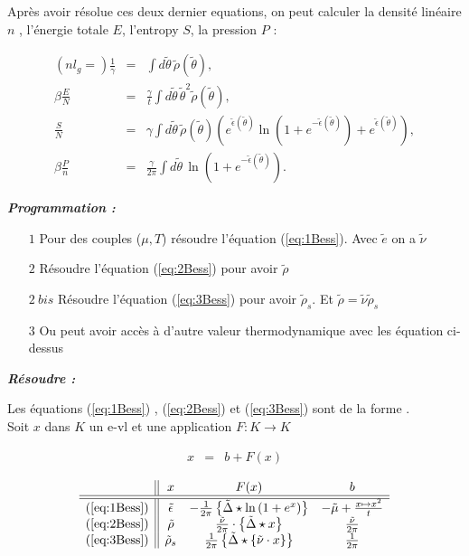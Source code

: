 Après avoir résolue ces deux dernier equations, on peut calculer la densité linéaire $n$ , l'énergie totale $E$, l'entropy $S$, la pression $P$ : 

\begin{eqnarray}\label{eq:5Bess}
	(nl_g = ) \frac{1}{\gamma} & = & \int d \tilde{\theta} \,\tilde{\rho}(\tilde{\theta}), \\
	\beta \frac{E}{N} & = & \frac{\gamma}{t} \int d \tilde{\theta}\,  \tilde{\theta}^2 \tilde{\rho}(\tilde{\theta}), \\
	\frac{S}{N} & = & \gamma 	\int d \tilde{\theta} \,\tilde{\rho}(\tilde{\theta}) \left ( e^{\tilde{\epsilon}(\tilde{\theta})} \ln \left ( 1 + e^{-\tilde{\epsilon}(\tilde{\theta})}  \right ) + e^{\tilde{\epsilon}(\tilde{\theta})} \right )  ,\\
	\beta \frac{P}{n}  & = & \frac{\gamma}{2 \pi} \int d \tilde{\theta} \, \ln \left ( 1 + e^{-\tilde{\epsilon}(\tilde{\theta})}  \right ).
\end{eqnarray}


{ \bf \em Programmation :}

\begin{itemize}
	\item[$1$] Pour des couples ($\mu , T $) résoudre l'équation (\ref{eq:1Bess}). Avec $\tilde{e}$ on a $\tilde{\nu}$
	\item[$2$] Résoudre l'équation (\ref{eq:2Bess}) pour avoir $\tilde{\rho}$
	\item[$2 ~bis$] Résoudre l'équation (\ref{eq:3Bess}) pour avoir $\tilde{\rho}_s$. Et $\tilde{\rho} = \tilde{\nu} \tilde{\rho}_s$
	\item[$3$] Ou peut avoir accès à d'autre valeur thermodynamique avec les équation ci-dessus
\end{itemize}

{ \bf \em Résoudre :}



Les équations (\ref{eq:1Bess}) ,   (\ref{eq:2Bess}) et  (\ref{eq:3Bess}) sont de la forme .\\

Soit $x$ dans $K$ un e-vl  et une application $F \colon K \rightarrow K $

\begin{eqnarray}
	x & = & b + F ( x ) 	
\end{eqnarray}


$$
\begin{array}{c||ccc}
	& x & F( x )  & b \\
	\hline\hline
	(\ref{eq:1Bess}) & \tilde{\epsilon} & - \frac{1}{2 \pi} \left \{\tilde{\Delta} \star \ln \left ( 1 + e^{x} \right )  \right \} & - \tilde{\mu} + \frac{x \mapsto x^2 }{t}	\\
	(\ref{eq:2Bess}) & \tilde{\rho}  & \frac{\tilde{\nu}}{2 \pi} \cdot  \left \{\tilde{\Delta} \star x \right \} & \frac{\tilde{\nu}}{2 \pi} \\
	(\ref{eq:3Bess}) & \tilde{\rho}_s  & \frac{1}{2 \pi} \left \{\tilde{\Delta} \star \{\tilde{\nu} \cdot  x\} \right \} & \frac{1}{2 \pi} 
\end{array}
$$

